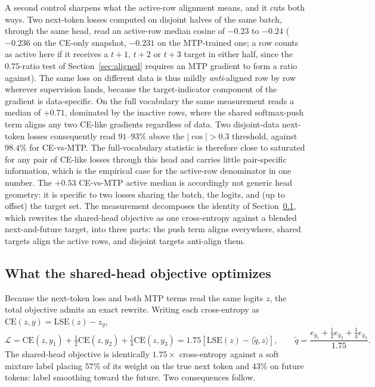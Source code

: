 A second control sharpens what the active-row alignment means, and it cuts both ways.
Two next-token losses computed on disjoint halves of the same batch, through the same
head, read an active-row median cosine of $-0.23$ to $-0.24$ ($-0.236$ on the CE-only snapshot,
$-0.231$ on the MTP-trained one; a row counts as active here if it receives a
$t{+}1$, $t{+}2$ or $t{+}3$ target in either half, since the $0.75$-ratio test of
Section~\ref{sec:aligned} requires an MTP gradient to form a ratio against). The same
loss on different data is thus mildly \emph{anti}-aligned row by row wherever
supervision lands, because the target-indicator component of the gradient is
data-specific. On the full vocabulary the same measurement reads a median of $+0.71$, dominated by the inactive rows, where the shared softmax-push term aligns any two CE-like gradients regardless of data. Two disjoint-data next-token losses consequently read $91$--$93\%$ above the $|\cos|>0.3$ threshold, against $98.4\%$ for CE-vs-MTP.
The full-vocabulary statistic is therefore close to saturated for any pair of CE-like
losses through this head and carries little pair-specific information, which is the
empirical case for the active-row denominator in one number. The $+0.53$ CE-vs-MTP
active median is accordingly not generic head geometry: it is specific to two losses
sharing the batch, the logits, and (up to offset) the target set. The measurement decomposes the identity of Section~\ref{sec:softlabel}, which rewrites the shared-head objective as one cross-entropy against a blended next-and-future target, into three parts: the push term
aligns everywhere, shared targets align the active rows, and disjoint targets
anti-align them.

\subsection{What the shared-head objective optimizes}
\label{sec:softlabel}
Because the next-token loss and both MTP terms read the same logits $z$, the total
objective admits an exact rewrite. Writing each cross-entropy as
$\mathrm{CE}(z,y) = \mathrm{LSE}(z) - z_y$,
%
\begin{equation}
\mathcal{L} = \mathrm{CE}(z,y_1) + \tfrac{1}{2}\mathrm{CE}(z,y_2) + \tfrac{1}{4}\mathrm{CE}(z,y_3)
 = 1.75\left[\mathrm{LSE}(z) - \langle \tilde{q}, z\rangle\right],
\qquad
\tilde{q} = \frac{e_{y_1} + \tfrac{1}{2}e_{y_2} + \tfrac{1}{4}e_{y_3}}{1.75}.
\label{eq:softlabel}
\end{equation}
%
The shared-head objective is identically $1.75\times$ cross-entropy against a soft
mixture label placing $57\%$ of its weight on the true next token and $43\%$ on
future tokens: label smoothing toward the future. Two consequences follow.


